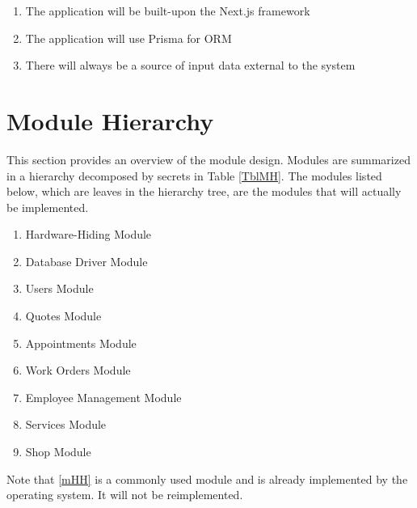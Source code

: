 \documentclass[12pt, titlepage]{article}
\begin{document}
\begin{enumerate}[label=\textbf{UC\arabic*:},ref=UC\arabic*]
	\item \label{ucNextjs} The application will be built-upon the Next.js framework
	\item \label{ucPrisma} The application will use Prisma for ORM
	\item \label{ucInput} There will always be a source of input data external to the system
\end{enumerate}

\section{Module Hierarchy} \label{SecMH}

This section provides an overview of the module design. Modules are summarized in a hierarchy
decomposed by secrets in Table \ref{TblMH}. The modules listed below, which are leaves in the
hierarchy tree, are the modules that will actually be implemented.

\begin{enumerate}[label=\textbf{M\arabic*:},ref=M\arabic*]
	\item \label{mHH} Hardware-Hiding Module
	\item \label{mDBDriver} Database Driver Module
	\item \label{mUsers} Users Module
	\item \label{mQuotes} Quotes Module
	\item \label{mAppointments} Appointments Module
	\item \label{mWorkOrders} Work Orders Module
	\item \label{mEmployeeManagement} Employee Management Module
	\item \label{mServices} Services Module
	\item \label{mShop} Shop Module
\end{enumerate}

Note that \ref{mHH} is a commonly used module and is already implemented by the operating system.
It will not be reimplemented.
\end{document}
